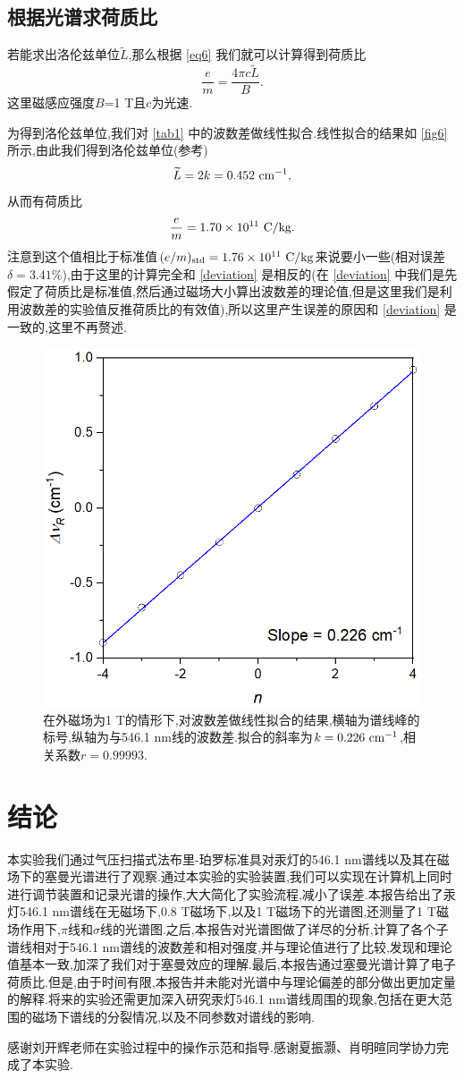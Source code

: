 \documentclass[font=default]{mpltx}
\begin{document}
\subsection{根据光谱求荷质比}
若能求出洛伦兹单位$\widetilde{L}$,那么根据 \autoref{eq6} 我们就可以计算得到荷质比
\begin{equation}\label{eq_e/m}
  \frac{e}{m}=\frac{4\pi c\widetilde{L}}{B}.
\end{equation}
这里磁感应强度$B$=1 T且$c$为光速.

为得到洛伦兹单位,我们对 \autoref{tab1} 中的波数差做线性拟合.线性拟合的结果如 \autoref{fig6} 所示,由此我们得到洛伦兹单位(参考)$$\widetilde{L}=2k=0.452\ {\rm cm^{-1}},$$从而有荷质比$$\frac{e}{m}=1.70\times 10^{11}\ {\rm C/kg}.$$注意到这个值相比于标准值$(e/m)_{\rm std}=1.76\times 10^{11}\ {\rm C/kg}$来说要小一些(相对误差$\delta=3.41\%$),由于这里的计算完全和 \autoref{deviation} 是相反的(在 \autoref{deviation} 中我们是先假定了荷质比是标准值,然后通过磁场大小算出波数差的理论值,但是这里我们是利用波数差的实验值反推荷质比的有效值),所以这里产生误差的原因和 \autoref{deviation} 是一致的,这里不再赘述.
\begin{figure}
  \centering
  \includegraphics[width=0.45\linewidth]{fig/linear_fit.png}
  \caption{在外磁场为1 T的情形下,对波数差做线性拟合的结果,横轴为谱线峰的标号,纵轴为与546.1 nm线的波数差.拟合的斜率为$k=0.226\ {\rm cm^{-1}}$,相关系数$r=0.99993$.}
  \label{fig6}
\end{figure}
\section{结论}
本实验我们通过气压扫描式法布里-珀罗标准具对汞灯的546.1 nm谱线以及其在磁场下的塞曼光谱进行了观察.通过本实验的实验装置,我们可以实现在计算机上同时进行调节装置和记录光谱的操作,大大简化了实验流程,减小了误差.本报告给出了汞灯546.1 nm谱线在无磁场下,0.8 T磁场下,以及1 T磁场下的光谱图,还测量了1 T磁场作用下,$\pi$线和$\sigma$线的光谱图.之后,本报告对光谱图做了详尽的分析,计算了各个子谱线相对于546.1 nm谱线的波数差和相对强度,并与理论值进行了比较,发现和理论值基本一致,加深了我们对于塞曼效应的理解.最后,本报告通过塞曼光谱计算了电子荷质比.但是,由于时间有限,本报告并未能对光谱中与理论偏差的部分做出更加定量的解释.将来的实验还需更加深入研究汞灯546.1 nm谱线周围的现象,包括在更大范围的磁场下谱线的分裂情况,以及不同参数对谱线的影响.
\begin{acknowledgments}
  感谢刘开辉老师在实验过程中的操作示范和指导.感谢夏振灏、肖明暄同学协力完成了本实验.
\end{acknowledgments}
\end{document}
